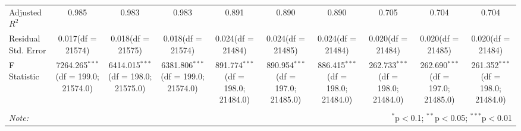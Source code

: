 \begin{table}[!htbp]
\begin{tabular}{@{\extracolsep{5pt}}lccccccccc}
 Adjusted $R^2$ & 0.985 & 0.983 & 0.983 & 0.891 & 0.890 & 0.890 & 0.705 & 0.704 & 0.704 \\
 Residual Std. Error & 0.017(df = 21574) & 0.018(df = 21575) & 0.018(df = 21574) & 0.024(df = 21484) & 0.024(df = 21485) & 0.024(df = 21484) & 0.020(df = 21484) & 0.020(df = 21485) & 0.020(df = 21484)  \\
 F Statistic & 7264.265$^{***}$ (df = 199.0; 21574.0) & 6414.015$^{***}$ (df = 198.0; 21575.0) & 6381.806$^{***}$ (df = 199.0; 21574.0) & 891.774$^{***}$ (df = 198.0; 21484.0) & 890.954$^{***}$ (df = 197.0; 21485.0) & 886.415$^{***}$ (df = 198.0; 21484.0) & 262.733$^{***}$ (df = 198.0; 21484.0) & 262.690$^{***}$ (df = 197.0; 21485.0) & 261.352$^{***}$ (df = 198.0; 21484.0) \\
\hline
\hline \\[-1.8ex]
\textit{Note:} & \multicolumn{9}{r}{$^{*}$p$<$0.1; $^{**}$p$<$0.05; $^{***}$p$<$0.01} \\
\end{tabular}
\end{table}